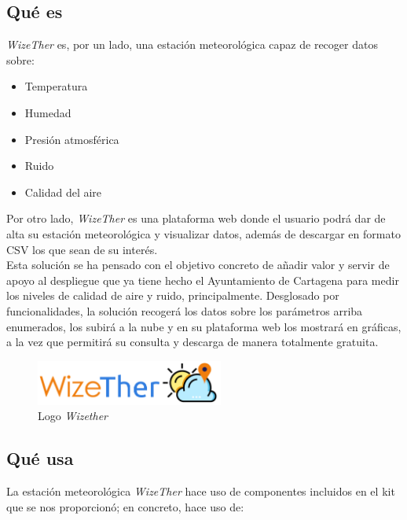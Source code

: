 \documentclass[12pt]{article}
\begin{document}
\subsection{Qué es} %

\textit{WizeTher} es, por un lado, una estación meteorológica capaz de recoger datos sobre:

\begin{itemize}
	\item Temperatura
	\item Humedad
	\item Presión atmosférica
	\item Ruido
	\item Calidad del aire \\
\end{itemize}

\noindent Por otro lado, \textit{WizeTher} es una plataforma web donde el usuario podrá dar de alta su estación meteorológica y visualizar datos, además de descargar en formato CSV los que sean de su interés. \\

\noindent Esta solución se ha pensado con el objetivo concreto de  añadir valor y servir de apoyo al despliegue que ya tiene hecho el Ayuntamiento de Cartagena para medir los niveles de calidad de aire y ruido, principalmente. Desglosado por funcionalidades, la solución recogerá los datos sobre los parámetros arriba enumerados, los subirá a la nube y en su plataforma web los mostrará en gráficas, a la vez que permitirá su consulta y descarga de manera totalmente gratuita. \\

\begin{figure}[h]
	\begin{center}
		\includegraphics[width=0.55\textwidth]{img_rani/logo_wizether_v1.png}
		\caption{Logo \textit{Wizether}}
	\end{center}
\end{figure}

\pagebreak

\subsection{Qué usa}

La estación meteorológica \textit{WizeTher} hace uso de componentes incluidos en el kit que se nos proporcionó; en concreto, hace uso de:
\end{document}
